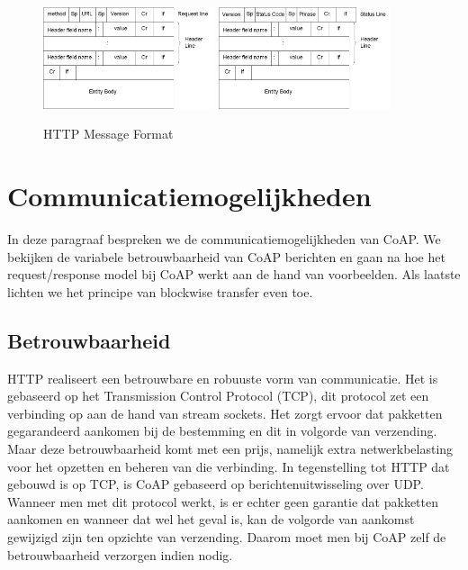 \begin{figure}[h]
\vspace{10pt}
\centering
{}
{\includegraphics[width=0.45\textwidth]{fig/HTTPRequestMessageFormat}}
{\includegraphics[width=0.45\textwidth]{fig/HTTPResponseMessageFormat}}
\caption{HTTP Message Format}\label{fig:HTTPMessageFormat}
\end{figure}

\newpage

\section{Communicatiemogelijkheden} \label{communicatieMogelijkheden}

In deze paragraaf bespreken we de communicatiemogelijkheden van CoAP. We bekijken de variabele betrouwbaarheid van CoAP berichten en gaan na hoe het request/response model bij CoAP werkt aan de hand van voorbeelden. Als laatste lichten we het principe van blockwise transfer even toe.

\subsection{Betrouwbaarheid} \label{betrouwbaarheid}

HTTP realiseert een betrouwbare en robuuste vorm van communicatie. Het is gebaseerd op het Transmission Control Protocol (TCP), dit protocol zet een verbinding op aan de hand van stream sockets. Het zorgt ervoor dat pakketten gegarandeerd aankomen bij de bestemming en dit in volgorde van verzending. Maar deze betrouwbaarheid komt met een prijs, namelijk extra netwerkbelasting voor het opzetten en beheren van die verbinding. In tegenstelling tot HTTP dat gebouwd is op TCP, is CoAP gebaseerd op berichtenuitwisseling over UDP. Wanneer men met dit protocol werkt, is er echter geen garantie dat pakketten aankomen en wanneer dat wel het geval is, kan de volgorde van aankomst gewijzigd zijn ten opzichte van verzending. Daarom moet men bij CoAP zelf de betrouwbaarheid verzorgen indien nodig.

